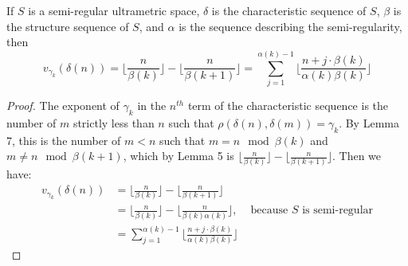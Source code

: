 \begin{proposition}
If $S$ is a semi-regular ultrametric space, $\delta$ is the characteristic sequence of $S$, $\beta$ is the structure sequence of $S$, and $\alpha$ is the sequence describing the semi-regularity, then
\[v_{\gamma_k}(\delta(n)) =  \lfloor\frac{n}{\beta(k)}\rfloor - \lfloor\frac{n}{\beta(k+1)}\rfloor = \sum_{j=1}^{\alpha(k)-1} \lfloor \frac{n + j\cdot \beta(k)}{\alpha(k)\beta(k)} \rfloor\]
\end{proposition}

\begin{proof}
The exponent of $\gamma_k$ in the $n^{th}$ term of the characteristic sequence is the number of $m$ strictly less than $n$ such that $\rho(\delta(n),\delta(m))=\gamma_k$. By Lemma 7, this is the number of $m <n$ such that $m = n \mod \beta(k)$  and $m \neq n \mod \beta(k+1)$, which by Lemma 5 is $\lfloor\frac{n}{\beta(k)}\rfloor - \lfloor\frac{n}{\beta(k+1)}\rfloor$. Then we have:
\begin{align*}
 v_{\gamma_k}(\delta(n)) &= \lfloor\frac{n}{\beta(k)}\rfloor - \lfloor\frac{n}{\beta(k+1)}\rfloor  \\
 &= \lfloor\frac{n}{\beta(k)}\rfloor - \lfloor\frac{n}{\beta(k)\alpha(k)}\rfloor\text{,}  &\text{ because } S \text{ is semi-regular}\\
 &= \sum_{j=1}^{\alpha(k)-1} \lfloor \frac{n + j\cdot \beta(k)}{\alpha(k)\beta(k)} \rfloor
\end{align*}
\end{proof}



